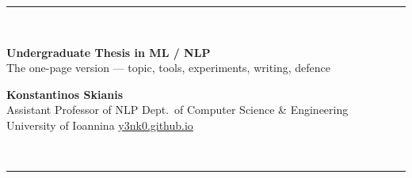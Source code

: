 \documentclass[10pt,a4paper]{article}
\newcommand{\lnk}[2]{\href{#1}{\color{brandlight}#2}}
\newcommand{\dt}{\,\textperiodcentered\,\allowbreak}
\begin{document}
\fontsize{6.10}{7.20}\selectfont

{\color{brandlight}\rule{\textwidth}{2pt}}\\[2pt]
\begin{minipage}[b]{0.63\textwidth}
{\fontsize{17}{18}\selectfont\bfseries\color{brand} Undergraduate Thesis in ML / NLP}\\[2pt]
{\fontsize{8}{9}\selectfont\color{ink} The one-page version --- topic, tools, experiments, writing, defence}
\end{minipage}%
\hfill
\begin{minipage}[b]{0.36\textwidth}\raggedleft
{\fontsize{8}{9}\selectfont\bfseries\color{ink} Konstantinos Skianis}\\[1pt]
{\color{mutegray} Assistant Professor of NLP\dt Dept.\ of Computer Science \& Engineering\\
University of Ioannina\dt \lnk{https://y3nk0.github.io}{y3nk0.github.io}}
\end{minipage}\\[2pt]
{\color{brandlight}\rule{\textwidth}{2pt}}
\end{document}
